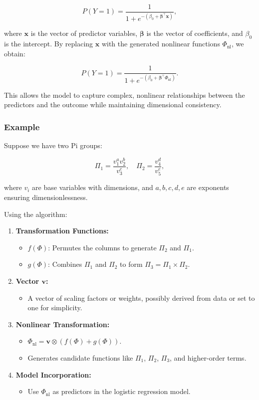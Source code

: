 \documentclass{article}
\theoremstyle{definition}
\theoremstyle{remark}
\begin{document}
\[
P(Y = 1) = \dfrac{1}{1 + e^{- ( \beta_0 + \boldsymbol{\beta}^\intercal \mathbf{x} ) }},
\]

where $\mathbf{x}$ is the vector of predictor variables, $\boldsymbol{\beta}$ is the vector of coefficients, and $\beta_0$ is the intercept. By replacing $\mathbf{x}$ with the generated nonlinear functions $\Phi_{\text{nl}}$, we obtain:

\[
P(Y = 1) = \dfrac{1}{1 + e^{- ( \beta_0 + \boldsymbol{\beta}^\intercal \Phi_{\text{nl}} ) }}.
\]

This allows the model to capture complex, nonlinear relationships between the predictors and the outcome while maintaining dimensional consistency.

\subsubsection{Example}

Suppose we have two Pi groups:

\[
\Pi_1 = \dfrac{v_1^a v_2^b}{v_3^c}, \quad \Pi_2 = \dfrac{v_4^d}{v_5^e},
\]

where $v_i$ are base variables with dimensions, and $a, b, c, d, e$ are exponents ensuring dimensionlessness.

Using the algorithm:

\begin{enumerate}
	\item \textbf{Transformation Functions:}
	\begin{itemize}
		\item $f(\Phi)$: Permutes the columns to generate $\Pi_2$ and $\Pi_1$.
		\item $g(\Phi)$: Combines $\Pi_1$ and $\Pi_2$ to form $\Pi_3 = \Pi_1 \times \Pi_2$.
	\end{itemize}
	\item \textbf{Vector $\mathbf{v}$:}
	\begin{itemize}
		\item A vector of scaling factors or weights, possibly derived from data or set to one for simplicity.
	\end{itemize}
	\item \textbf{Nonlinear Transformation:}
	\begin{itemize}
		\item $\Phi_{\text{nl}} = \mathbf{v} \otimes \left( f(\Phi) + g(\Phi) \right)$.
		\item Generates candidate functions like $\Pi_1$, $\Pi_2$, $\Pi_3$, and higher-order terms.
	\end{itemize}
	\item \textbf{Model Incorporation:}
	\begin{itemize}
		\item Use $\Phi_{\text{nl}}$ as predictors in the logistic regression model.
	\end{itemize}
\end{enumerate}
\end{document}
